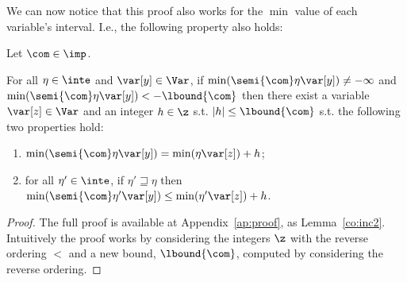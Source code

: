 We can now notice that this proof also works for the \(\min\) value of
each variable's interval. I.e., the following property also holds:

\begin{lemma}\label{co:inc}
  Let \(\com \in \imp\).
  
  \noindent
  For all \(\eta \in \inte\) and
  \(\var[y] \in \Var\), if
  \(\min(\semi{\com}\eta\var[y]) \neq -\infty\) and
  \(\min(\semi{\com}\eta\var[y]) < -\lbound{\com}\) then there exist a
  variable \(\var[z] \in\Var\) and an integer \(h \in \z\) s.t.
  \(|h| \leq \lbound{\com}\) s.t. the following two properties hold:
  
  \begin{enumerate}[label=(\roman*)]
  \item \(\min(\semi{\com}\eta \var[y]) = \min(\eta \var[z]) + h\);
  \item for all \(\eta' \in \inte\), if \(\eta' \sqsupseteq \eta\)
    then
    \(\min(\semi{\com}\eta' \var[y]) \leq \min(\eta' \var[z]) +
    h\).
  \end{enumerate}
\end{lemma}

\begin{proof}
  The full proof is available at Appendix~\ref{ap:proof}, as
  Lemma~\ref{co:inc2}. Intuitively the proof works by considering the
  integers \(\z\) with the reverse ordering \(<\) and a new bound,
  \(\lbound{\com}\), computed by considering the reverse ordering.
\end{proof}

